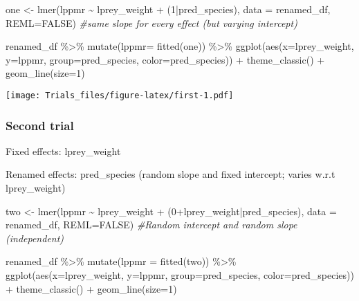 \documentclass[
]{article}
\newenvironment{Shaded}{\begin{snugshade}}{\end{snugshade}}
\newcommand{\AttributeTok}[1]{\textcolor[rgb]{0.77,0.63,0.00}{#1}}
\newcommand{\CommentTok}[1]{\textcolor[rgb]{0.56,0.35,0.01}{\textit{#1}}}
\newcommand{\ConstantTok}[1]{\textcolor[rgb]{0.00,0.00,0.00}{#1}}
\newcommand{\DecValTok}[1]{\textcolor[rgb]{0.00,0.00,0.81}{#1}}
\newcommand{\FunctionTok}[1]{\textcolor[rgb]{0.00,0.00,0.00}{#1}}
\newcommand{\NormalTok}[1]{#1}
\newcommand{\OtherTok}[1]{\textcolor[rgb]{0.56,0.35,0.01}{#1}}
\newcommand{\SpecialCharTok}[1]{\textcolor[rgb]{0.00,0.00,0.00}{#1}}
\begin{document}
\begin{Shaded}
\begin{Highlighting}[]
\NormalTok{one }\OtherTok{\textless{}{-}} \FunctionTok{lmer}\NormalTok{(lppmr }\SpecialCharTok{\textasciitilde{}}\NormalTok{ lprey\_weight }\SpecialCharTok{+}\NormalTok{ (}\DecValTok{1}\SpecialCharTok{|}\NormalTok{pred\_species), }\AttributeTok{data =}\NormalTok{ renamed\_df, }\AttributeTok{REML=}\ConstantTok{FALSE}\NormalTok{)}
\CommentTok{\#same slope for every effect (but varying intercept)}

\NormalTok{renamed\_df }\SpecialCharTok{\%\textgreater{}\%} 
    \FunctionTok{mutate}\NormalTok{(}\AttributeTok{lppmr=} \FunctionTok{fitted}\NormalTok{(one)) }\SpecialCharTok{\%\textgreater{}\%} 
    \FunctionTok{ggplot}\NormalTok{(}\FunctionTok{aes}\NormalTok{(}\AttributeTok{x=}\NormalTok{lprey\_weight, }\AttributeTok{y=}\NormalTok{lppmr, }\AttributeTok{group=}\NormalTok{pred\_species, }\AttributeTok{color=}\NormalTok{pred\_species)) }\SpecialCharTok{+} 
    \FunctionTok{theme\_classic}\NormalTok{() }\SpecialCharTok{+}
    \FunctionTok{geom\_line}\NormalTok{(}\AttributeTok{size=}\DecValTok{1}\NormalTok{) }
\end{Highlighting}
\end{Shaded}

\texttt{[image: Trials\_files/figure-latex/first-1.pdf]}

\hypertarget{second-trial}{%
\subsubsection{Second trial}\label{second-trial}}

Fixed effects: lprey\_weight

Renamed effects: pred\_species (random slope and fixed intercept; varies
w.r.t lprey\_weight)

\begin{Shaded}
\begin{Highlighting}[]
\NormalTok{two }\OtherTok{\textless{}{-}} \FunctionTok{lmer}\NormalTok{(lppmr }\SpecialCharTok{\textasciitilde{}}\NormalTok{ lprey\_weight }\SpecialCharTok{+}\NormalTok{ (}\DecValTok{0}\SpecialCharTok{+}\NormalTok{lprey\_weight}\SpecialCharTok{|}\NormalTok{pred\_species), }\AttributeTok{data =}\NormalTok{ renamed\_df, }\AttributeTok{REML=}\ConstantTok{FALSE}\NormalTok{)}
\CommentTok{\#Random intercept and random slope (independent)}

\NormalTok{renamed\_df }\SpecialCharTok{\%\textgreater{}\%} 
    \FunctionTok{mutate}\NormalTok{(}\AttributeTok{lppmr =} \FunctionTok{fitted}\NormalTok{(two)) }\SpecialCharTok{\%\textgreater{}\%} 
    \FunctionTok{ggplot}\NormalTok{(}\FunctionTok{aes}\NormalTok{(}\AttributeTok{x=}\NormalTok{lprey\_weight, }\AttributeTok{y=}\NormalTok{lppmr, }\AttributeTok{group=}\NormalTok{pred\_species, }\AttributeTok{color=}\NormalTok{pred\_species)) }\SpecialCharTok{+} 
    \FunctionTok{theme\_classic}\NormalTok{() }\SpecialCharTok{+}
    \FunctionTok{geom\_line}\NormalTok{(}\AttributeTok{size=}\DecValTok{1}\NormalTok{) }
\end{Highlighting}
\end{Shaded}
\end{document}
